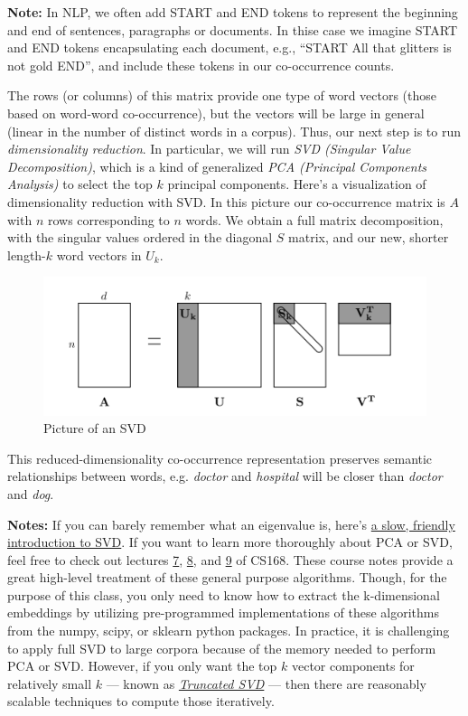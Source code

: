 \documentclass[11pt]{article}
\makeatletter
\def\maxwidth{\ifdim\Gin@nat@width>\linewidth\linewidth
    \else\Gin@nat@width\fi}
\let\Oldincludegraphics\includegraphics
\renewcommand{\includegraphics}[1]{\Oldincludegraphics[width=.8\maxwidth]{#1}}
\makeatother
\begin{document}
\textbf{Note:} In NLP, we often add START and END tokens to represent
the beginning and end of sentences, paragraphs or documents. In thise
case we imagine START and END tokens encapsulating each document, e.g.,
``START All that glitters is not gold END'', and include these tokens in
our co-occurrence counts.

The rows (or columns) of this matrix provide one type of word vectors
(those based on word-word co-occurrence), but the vectors will be large
in general (linear in the number of distinct words in a corpus). Thus,
our next step is to run \emph{dimensionality reduction}. In particular,
we will run \emph{SVD (Singular Value Decomposition)}, which is a kind
of generalized \emph{PCA (Principal Components Analysis)} to select the
top \(k\) principal components. Here's a visualization of dimensionality
reduction with SVD. In this picture our co-occurrence matrix is \(A\)
with \(n\) rows corresponding to \(n\) words. We obtain a full matrix
decomposition, with the singular values ordered in the diagonal \(S\)
matrix, and our new, shorter length-\(k\) word vectors in \(U_k\).

\begin{figure}
\centering
\includegraphics{imgs/svd.png}
\caption{Picture of an SVD}
\end{figure}

This reduced-dimensionality co-occurrence representation preserves
semantic relationships between words, e.g. \emph{doctor} and
\emph{hospital} will be closer than \emph{doctor} and \emph{dog}.

\textbf{Notes:} If you can barely remember what an eigenvalue is, here's
\href{https://davetang.org/file/Singular_Value_Decomposition_Tutorial.pdf}{a
slow, friendly introduction to SVD}. If you want to learn more
thoroughly about PCA or SVD, feel free to check out lectures
\href{https://web.stanford.edu/class/cs168/l/l7.pdf}{7},
\href{http://theory.stanford.edu/~tim/s15/l/l8.pdf}{8}, and
\href{https://web.stanford.edu/class/cs168/l/l9.pdf}{9} of CS168. These
course notes provide a great high-level treatment of these general
purpose algorithms. Though, for the purpose of this class, you only need
to know how to extract the k-dimensional embeddings by utilizing
pre-programmed implementations of these algorithms from the numpy,
scipy, or sklearn python packages. In practice, it is challenging to
apply full SVD to large corpora because of the memory needed to perform
PCA or SVD. However, if you only want the top \(k\) vector components
for relatively small \(k\) --- known as
\emph{\href{https://en.wikipedia.org/wiki/Singular_value_decomposition\#Truncated_SVD}{Truncated
SVD}} --- then there are reasonably scalable techniques to compute those
iteratively.
\end{document}
